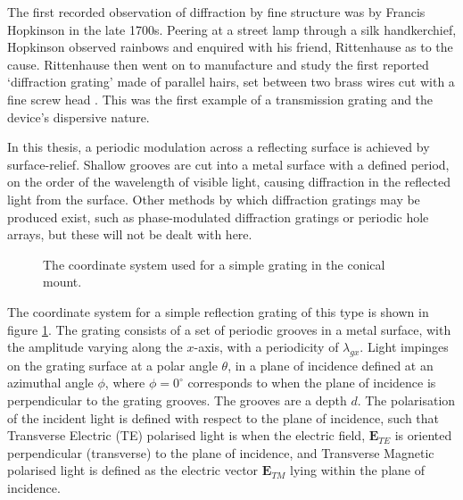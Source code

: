 The first recorded observation of diffraction by fine structure was by Francis Hopkinson in the late 1700s. Peering at a street lamp through a silk handkerchief, Hopkinson observed rainbows and enquired with his friend, Rittenhause as to the cause. Rittenhause then went on to manufacture and study the first reported `diffraction grating' made of parallel hairs, set between two brass wires cut with a fine screw head \cite{Rittenhause1786}. This was the first example of a transmission grating and the device's dispersive nature.

In this thesis, a periodic modulation across a reflecting surface is achieved by surface-relief. Shallow grooves are cut into a metal surface with a defined period, on the order of the wavelength of visible light, causing diffraction in the reflected light from the surface. Other methods by which diffraction gratings may be produced exist, such as phase-modulated diffraction gratings \cite{Palmer2005} or periodic hole arrays, but these will not be dealt with here.

\begin{figure}
\begin{center}

\end{center}
\caption{The coordinate system used for a simple grating in the conical mount.\label{fig:simple-coordsys}}
\end{figure} 

The coordinate system for a simple reflection grating of this type is shown in figure \ref{fig:simple-coordsys}. The grating consists of a set of periodic grooves in a metal surface, with the amplitude varying along the $x$-axis, with a periodicity of $\lambda_{gx}$. Light impinges on the grating surface at a polar angle $\theta$, in a plane of incidence defined at an azimuthal angle $\phi$, where $\phi=0^\circ$ corresponds to when the plane of incidence is perpendicular to the grating grooves. The grooves are a depth $d$. The polarisation of the incident light is defined with respect to the plane of incidence, such that Transverse Electric (TE) polarised light is when the electric field, $\mathbf{E}_{TE}$ is oriented perpendicular (transverse) to the plane of incidence, and Transverse Magnetic polarised light is defined as the electric vector $\mathbf{E}_{TM}$ lying within the plane of incidence.


